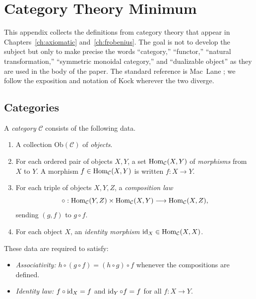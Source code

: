 %
%

\section{Category Theory Minimum}\label{app:category}

This appendix collects the definitions from category theory that appear in Chapters~\ref{ch:axiomatic} and~\ref{ch:frobenius}.  The goal is not to develop the subject but only to make precise the words ``category,'' ``functor,'' ``natural transformation,'' ``symmetric monoidal category,'' and ``dualizable object'' as they are used in the body of the paper.  The standard reference is Mac~Lane \cite{MacLane1998}; we follow the exposition and notation of Kock \cite{Kock2004Frobenius} wherever the two diverge.

\subsection{Categories}\label{appsec:categories}

\begin{definition}[Category]\label{def:category}
A \emph{category} $\mathcal{C}$ consists of the following data.
\begin{enumerate}
\item A collection $\mathrm{Ob}(\mathcal{C})$ of \emph{objects}.
\item For each ordered pair of objects $X,Y$, a set $\operatorname{Hom}_{\mathcal{C}}(X,Y)$ of \emph{morphisms} from $X$ to $Y$.  A morphism $f \in \operatorname{Hom}_{\mathcal{C}}(X,Y)$ is written $f : X \to Y$.
\item For each triple of objects $X,Y,Z$, a \emph{composition law}
\begin{equation}\label{eq:cat-composition}
\circ : \operatorname{Hom}_{\mathcal{C}}(Y,Z) \times \operatorname{Hom}_{\mathcal{C}}(X,Y) \longrightarrow \operatorname{Hom}_{\mathcal{C}}(X,Z),
\end{equation}
sending $(g,f)$ to $g \circ f$.
\item For each object $X$, an \emph{identity morphism} $\operatorname{id}_X \in \operatorname{Hom}_{\mathcal{C}}(X,X)$.
\end{enumerate}
These data are required to satisfy:
\begin{itemize}
\item \emph{Associativity:} $h \circ (g \circ f) = (h \circ g) \circ f$ whenever the compositions are defined.
\item \emph{Identity law:} $f \circ \operatorname{id}_X = f$ and $\operatorname{id}_Y \circ f = f$ for all $f : X \to Y$.
\end{itemize}
\end{definition}

